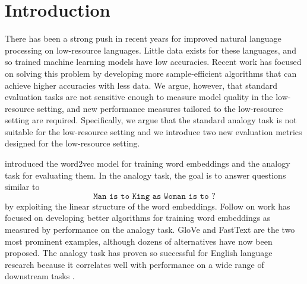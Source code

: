 \documentclass[11pt,a4paper]{article}
\begin{document}
\section{Introduction}
There has been a strong push in recent years for improved natural language processing on low-resource languages.
Little data exists for these languages,
and so trained machine learning models have low accuracies.
Recent work has focused on solving this problem by developing more sample-efficient algorithms that can achieve higher accuracies with less data.
We argue, however, that standard evaluation tasks are not sensitive enough to measure model quality in the low-resource setting,
and new performance measures tailored to the low-resource setting are required.
Specifically, we argue that the standard analogy task is not suitable for the low-resource setting and we introduce two new evaluation metrics designed for the low-resource setting.
\label{sec:intro}

\citet{mikolov2013efficient} introduced the word2vec model for training word embeddings and the analogy task for evaluating them.
In the analogy task, the goal is to answer questions similar to
\begin{equation*}
    \texttt{Man is to King as Woman is to ?}
\end{equation*}
by exploiting the linear structure of the word embeddings.
Follow on work has focused on developing better algorithms for training word embeddings as measured by performance on the analogy task.
GloVe \citep{pennington2014glove} and FastText \citep{bojanowski2016enriching} are the two most prominent examples,
although dozens of alternatives have now been proposed.
The analogy task has proven so successful for English language research because it correlates well with performance on a wide range of downstream tasks \citep{wang2019evaluating}.
\end{document}
